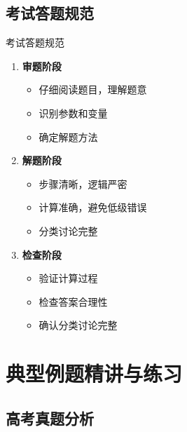 \documentclass[a4paper,11pt]{ctexart}
\theoremstyle{definition}
\theoremstyle{remark}
\begin{document}
\subsection{考试答题规范}

\begin{methodbox}{考试答题规范}
\begin{enumerate}
    \item \textbf{审题阶段}
    \begin{itemize}
        \item 仔细阅读题目，理解题意
        \item 识别参数和变量
        \item 确定解题方法
    \end{itemize}
    \item \textbf{解题阶段}
    \begin{itemize}
        \item 步骤清晰，逻辑严密
        \item 计算准确，避免低级错误
        \item 分类讨论完整
    \end{itemize}
    \item \textbf{检查阶段}
    \begin{itemize}
        \item 验证计算过程
        \item 检查答案合理性
        \item 确认分类讨论完整
    \end{itemize}
\end{enumerate}
\end{methodbox}

\section{典型例题精讲与练习}

\subsection{高考真题分析}
\end{document}
